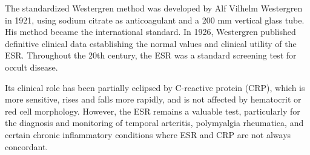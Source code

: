 The standardized Westergren method was developed by Alf Vilhelm Westergren in 1921, using sodium citrate as anticoagulant and a 200 mm vertical glass tube. His method became the international standard. In 1926, Westergren published definitive clinical data establishing the normal values and clinical utility of the ESR. Throughout the 20th century, the ESR was a standard screening test for occult disease.

Its clinical role has been partially eclipsed by C-reactive protein (CRP), which is more sensitive, rises and falls more rapidly, and is not affected by hematocrit or red cell morphology. However, the ESR remains a valuable test, particularly for the diagnosis and monitoring of temporal arteritis, polymyalgia rheumatica, and certain chronic inflammatory conditions where ESR and CRP are not always concordant.

